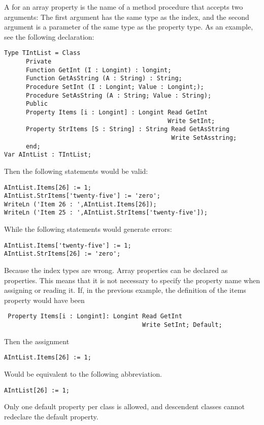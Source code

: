 A  for an array property is the name of a method
procedure that accepts two arguments: The first argument has the same
type as the index, and the second argument is a parameter of the same
type as the property type.
As an example, see the following declaration:
\begin{verbatim}
Type TIntList = Class
      Private
      Function GetInt (I : Longint) : longint;
      Function GetAsString (A : String) : String;
      Procedure SetInt (I : Longint; Value : Longint;);
      Procedure SetAsString (A : String; Value : String);
      Public
      Property Items [i : Longint] : Longint Read GetInt
                                             Write SetInt;
      Property StrItems [S : String] : String Read GetAsString
                                              Write SetAsstring;
      end;
Var AIntList : TIntList;
\end{verbatim}
Then the following statements would be valid:
\begin{verbatim}
AIntList.Items[26] := 1;
AIntList.StrItems['twenty-five'] := 'zero';
WriteLn ('Item 26 : ',AIntList.Items[26]);
WriteLn ('Item 25 : ',AIntList.StrItems['twenty-five']);
\end{verbatim}
While the following statements would generate errors:
\begin{verbatim}
AIntList.Items['twenty-five'] := 1;
AIntList.StrItems[26] := 'zero';
\end{verbatim}
Because the index types are wrong.
Array properties can be declared as  properties. This means that
it is not necessary to specify the property name when assigning or reading
it. If, in the previous example, the definition of the items property would
have been
\begin{verbatim}
 Property Items[i : Longint]: Longint Read GetInt
                                      Write SetInt; Default;
\end{verbatim}
Then the assignment
\begin{verbatim}
AIntList.Items[26] := 1;
\end{verbatim}
Would be equivalent to the following abbreviation.
\begin{verbatim}
AIntList[26] := 1;
\end{verbatim}
Only one default property per class is allowed, and descendent classes
cannot redeclare the default property.




